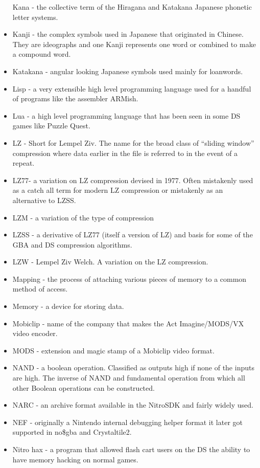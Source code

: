 \documentclass[
]{book}
\begin{document}
\begin{itemize}
  Kana - the collective term of the Hiragana and Katakana Japanese phonetic letter systems.
\item
  Kanji - the complex symbols used in Japanese that originated in Chinese. They are ideographs and one Kanji represents one word or combined to make a compound word.
\item
  Katakana - angular looking Japanese symbols used mainly for loanwords.
\item
  Lisp - a very extensible high level programming language used for a handful of programs like the assembler ARMish.
\item
  Lua - a high level programming language that has been seen in some DS games like Puzzle Quest.
\item
  LZ - Short for Lempel Ziv. The name for the broad class of ``sliding window'' compression where data earlier in the file is referred to in the event of a repeat.
\item
  LZ77- a variation on LZ compression devised in 1977. Often mistakenly used as a catch all term for modern LZ compression or mistakenly as an alternative to LZSS.
\item
  LZM - a variation of the type of compression
\item
  LZSS - a derivative of LZ77 (itself a version of LZ) and basis for some of the GBA and DS compression algorithms.
\item
  LZW - Lempel Ziv Welch. A variation on the LZ compression.
\item
  Mapping - the process of attaching various pieces of memory to a common method of access.
\item
  Memory - a device for storing data.
\item
  Mobiclip - name of the company that makes the Act Imagine/MODS/VX video encoder.
\item
  MODS - extension and magic stamp of a Mobiclip video format.
\item
  NAND - a boolean operation. Classified as outputs high if none of the inputs are high. The inverse of NAND and fundamental operation from which all other Boolean operations can be constructed.
\item
  NARC - an archive format available in the NitroSDK and fairly widely used.
\item
  NEF - originally a Nintendo internal debugging helper format it later got supported in no\$gba and Crystaltile2.
\item
  Nitro hax - a program that allowed flash cart users on the DS the ability to have memory hacking on normal games.

\end{itemize}
\end{document}
